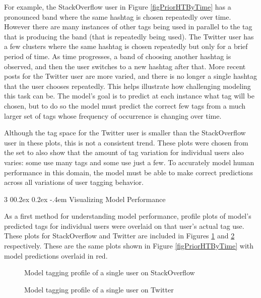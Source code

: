 \documentclass[man,floatsintext,donotrepeattitle]{apa6}
\makeatletter
\renewcommand{\subsubsection}{%
  \@startsection
  {subsubsection}%
  {3}%
  {\parindent}%
  {0\baselineskip \@plus 0.2ex \@minus 0.2ex}%
  {-.4em}%
  {\normalfont\normalsize\bfseries\addperi}}
\makeatother
\begin{document}
For example, the StackOverflow user in Figure \ref{figPriorHTByTime} has a pronounced band where the same hashtag is chosen repeatedly over time. 
However there are many instances of other tags being used in parallel to the tag that is producing the band (that is repeatedly being used). 
The Twitter user has a few clusters where the same hashtag is chosen repeatedly but only for a brief period of time.
As time progresses, a band of choosing another hashtag is observed, and then the user switches to a new hashtag after that.
More recent posts for the Twitter user are more varied, and there is no longer a single hashtag that the user chooses repeatedly.
This helps illustrate how challenging modeling this task can be.
The model's goal is to predict at each instance what tag will be chosen, but to do so the model must predict the correct few tags from a much larger set of tags whose frequency of occurrence is changing over time.


Although the tag space for the Twitter user is smaller than the StackOverflow user in these plots, this is not a consistent trend.
These plots were chosen from the set to also show that the amount of tag variation for individual users also varies: some use many tags and some use just a few.
To accurately model human performance in this domain, the model must be able to make correct predictions across all variations of user tagging behavior. 

\subsubsection{Visualizing Model Performance}

As a first method for understanding model performance, profile plots of model's predicted tags for individual users were overlaid on that user's actual tag use.
These plots for StackOverflow and Twitter are included in Figures \ref{figPriorHTMByTimeSO} and \ref{figPriorHTMByTimeT} respectively.
These are the same plots shown in Figure \ref{figPriorHTByTime} with model predictions overlaid in red. 

\begin{figure}[!htbp]
  \caption{Model tagging profile of a single user on StackOverflow}
  \label{figPriorHTMByTimeSO}
\end{figure}

\begin{figure}[!htbp]
  \caption{Model tagging profile of a single user on Twitter}
  \label{figPriorHTMByTimeT}
\end{figure}
\end{document}

